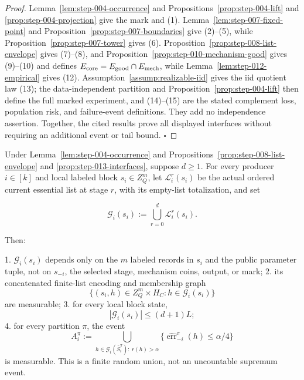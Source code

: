 \begin{proof}
Lemma~\ref{lem:step-004-occurrence} and
Propositions~\ref{prop:step-004-lift} and
\ref{prop:step-004-projection} give the mark and (1).
Lemma~\ref{lem:step-007-fixed-point} and
Proposition~\ref{prop:step-007-boundaries} give (2)--(5), while
Proposition~\ref{prop:step-007-tower} gives (6).
Proposition~\ref{prop:step-008-list-envelope} gives (7)--(8), and
Proposition~\ref{prop:step-010-mechanism-good} gives (9)--(10) and defines
\(E_{\rm core}=E_{\rm good}\cap E_{\rm mech}\), while
Lemma~\ref{lem:step-012-empirical} gives (12).
Assumption~\ref{assump:realizable-iid} gives the iid quotient law (13); the
data-independent partition and Proposition~\ref{prop:step-004-lift} then
define the full marked experiment, and (14)--(15) are the stated complement
loss, population risk, and failure-event definitions. They add no
independence assertion. Together, the cited results prove all displayed
interfaces without requiring an additional event or tail bound. \(\square\)
\end{proof}

\begin{lemma}\label{lem:step-013-block-family}
Under Lemma~\ref{lem:step-004-occurrence} and
Propositions~\ref{prop:step-008-list-envelope} and
\ref{prop:step-013-interfaces}, suppose \(d\geq1\). For every
producer \(i\in[k]\) and local labeled block \(s_i\in Z_Q^m\), let
\(\mathcal L_i^r(s_i)\) be the actual ordered current essential list at stage
\(r\), with its empty-list totalization, and set

\[
 \mathcal G_i(s_i)
 :=\bigcup_{r=0}^d\mathcal L_i^r(s_i).
 \tag{16}
\]

Then:

1. \(\mathcal G_i(s_i)\) depends only on the \(m\) labeled records in
   \(s_i\) and the public parameter tuple, not on \(s_{-i}\), the selected
   stage, mechanism coins, output, or mark;
2. its concatenated finite-list encoding and membership graph
   \[
     \{(s_i,h)\in Z_Q^m\times H_C:h\in\mathcal G_i(s_i)\}
     \tag{17}
   \]
   are measurable;
3. for every local block state,
   \[
     |\mathcal G_i(s_i)|\leq(d+1)L;
     \tag{18}
   \]
4. for every partition \(\pi\), the event
   \[
    A_i^\pi:=
    \bigcup_{h\in\mathcal G_i(\bar S_i^\pi):\ r(h)>\alpha}
      \{\widehat{\operatorname{err}}_{-i}^\pi(h)\leq\alpha/4\}
    \tag{19}
   \]
   is measurable. This is a finite random union, not an uncountable
   supremum event.


\end{lemma}

